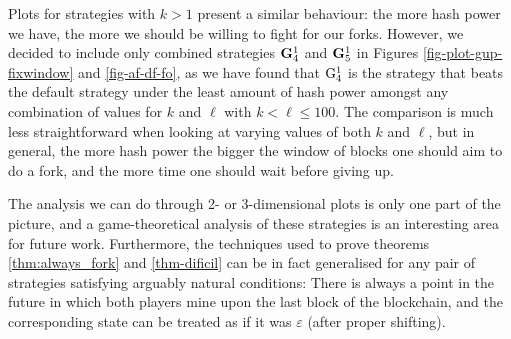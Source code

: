 Plots for strategies with $k > 1$ present a similar behaviour: the more hash power we have, the more we should be willing to fight for our forks. However, we decided to include only combined strategies ${\rm {\bf G}}^1_4$ and ${\rm {\bf G}}^1_5$ in Figures \ref{fig-plot-gup-fixwindow} and \ref{fig-af-df-fo},
as we have found that 
${\rm {G}}^1_4$ is the strategy that beats the default strategy under the least amount of hash power 
amongst any combination of values for $k$ and $\ell$ with $k < \ell \leq 100$. The comparison is much less straightforward when looking at varying values of both $k$ and $\ell$, but in general, 
the more hash power the bigger the window of blocks one should aim to do a fork, and the more time one should wait before giving up. 

The analysis we can do  through 2- or 3-dimensional plots is only one part of the picture, and a game-theoretical analysis of these strategies is an interesting area for future work. 
Furthermore, the techniques used to prove theorems \ref{thm:always_fork} and \ref{thm-dificil} can be in fact generalised for any pair of strategies satisfying arguably natural conditions: There is always a point in the future in which both players mine upon the last block of the blockchain, and the corresponding state can be treated as if it was $\varepsilon$ (after proper shifting).



